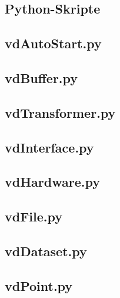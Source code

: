 \documentclass[a4paper,12pt,bibliography=totoc, listof=totoc,titlepage,pointlessnumbers]{scrreprt}
\begin{document}
\renewcommand{\appendixpagename}{\appendixname} 
\renewcommand{\appendixtocname}{\appendixname} 
\begin{appendices}

\chapter{Python-Skripte}
\label{a:skripte}
\section{vdAutoStart.py}
\label{a:vdAutoStart.py}


\section{vdBuffer.py}
\label{a:vdBuffer.py}


\section{vdTransformer.py}
\label{a:vdTransformer.py}


\section{vdInterface.py}
\label{a:vdInterface.py}


\section{vdHardware.py}
\label{a:vdHardware.py}


\section{vdFile.py}
\label{a:vdFile.py}


\section{vdDataset.py}
\label{a:vdDataset.py}


\section{vdPoint.py}
\label{a:vdPoint.py}



\end{appendices}
\end{document}
